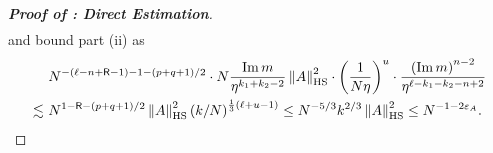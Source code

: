 \documentclass[10pt,reqno]{amsart}
\numberwithin{equation}{section}
\numberwithin{figure}{section}
\theoremstyle{plain} %
\theoremstyle{definition} %
\renewcommand{\txt}[1]{\text{\rm{#1}}}
\newcommand{\sR}{\mathsf R}
\renewcommand{\leq}{\le}
\newcommand{\p}[1]{({#1})}
\newcommand{\pa}[1]{\left({#1}\right)}
\newcommand{\norma}[1]{\left\lVert #1 \right\rVert}
\DeclareMathOperator{\im}{\mathrm{Im}}
\newcommand{\HS}{\txt{HS}}
\newcommand{\mm}{\ell}
\numberwithin{equation}{section}
\begin{document}
\begin{proof}[\bf Proof of : Direct Estimation]
\begin{equation}
\begin{aligned}
             \end{aligned}
         \end{equation}
         and bound part (ii) as
         \begin{equation}\label{concrete_bound_type_2_1_2}
             \begin{aligned}
                 &~N^{-\pa{\mm-n+\sR-1} -1 -\pa{p+q+1}/2}\cdot N\frac{\im m}{\eta^{k_1+k_2-2}}\norma{A}_{\HS}^2\cdot \pa{\frac{1}{N\eta}}^{u}\cdot \frac{\pa{\im m}^{n-2}}{\eta^{\mm-k_1-k_2-n+2}}\\
                 \lesssim &~N^{1-\sR-\pa{p+q+1}/2}\norma{A}_{\HS}^2\pa{k/N }^{\frac 1 3\p{\mm+u-1}}\leq N^{-5/3}k^{2/3}\norma{A}_{\HS}^2\leq N^{-1-2\varepsilon_A}.
             \end{aligned}
         \end{equation}


\end{proof}
\end{document}
